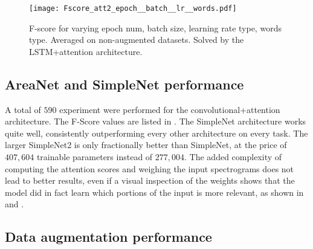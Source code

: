 \begin{figure*}[t!]
    \centering
    \texttt{[image: Fscore\_att2\_epoch\_\_batch\_\_lr\_\_words.pdf]}
    \caption{F-score for varying
        epoch num,
        batch size,
        learning rate type,
        words type.
        Averaged on non-augmented datasets.
        Solved by the LSTM+attention architecture.
        }%
    \label{fig:att_epoch_batch_lr_words}
\end{figure*}

\subsection{AreaNet and SimpleNet performance}


A total of $590$ experiment were performed for the convolutional+attention
architecture.
%
The F-Score values are listed in .
%
The SimpleNet architecture works quite well, consistently outperforming every
other architecture on every task. The larger SimpleNet2 is only fractionally
better than SimpleNet, at the price of $407,604$ trainable parameters instead
of $277,004$.
%
The added complexity of computing the attention scores and weighing the input
spectrograms does not lead to better results, even if a visual inspection of
the weights shows that the model did in fact learn which portions of the input
is more relevant, as shown in  and
.

\subsection{Data augmentation performance}
\label{sec:augmentation_performance}


